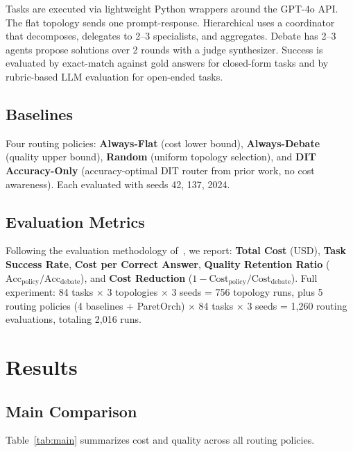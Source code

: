 \documentclass{article}
\begin{document}
Tasks are executed via lightweight Python wrappers around the GPT-4o API. The flat topology sends one prompt-response. Hierarchical uses a coordinator that decomposes, delegates to 2--3 specialists, and aggregates. Debate has 2--3 agents propose solutions over 2 rounds with a judge synthesizer. Success is evaluated by exact-match against gold answers for closed-form tasks and by rubric-based LLM evaluation for open-ended tasks.

\subsection{Baselines}

Four routing policies: \textbf{Always-Flat} (cost lower bound), \textbf{Always-Debate} (quality upper bound), \textbf{Random} (uniform topology selection), and \textbf{DIT Accuracy-Only} (accuracy-optimal DIT router from prior work, no cost awareness). Each evaluated with seeds 42, 137, 2024.

\subsection{Evaluation Metrics}

Following the evaluation methodology of~\cite{hu2024routerbench}, we report: \textbf{Total Cost} (USD), \textbf{Task Success Rate}, \textbf{Cost per Correct Answer}, \textbf{Quality Retention Ratio} ($\text{Acc}_{\text{policy}} / \text{Acc}_{\text{debate}}$), and \textbf{Cost Reduction} ($1 - \text{Cost}_{\text{policy}} / \text{Cost}_{\text{debate}}$). Full experiment: 84 tasks $\times$ 3 topologies $\times$ 3 seeds = 756 topology runs, plus 5 routing policies (4 baselines + ParetOrch) $\times$ 84 tasks $\times$ 3 seeds = 1,260 routing evaluations, totaling 2,016 runs.

\section{Results}
\label{sec:results}

\subsection{Main Comparison}

Table~\ref{tab:main} summarizes cost and quality across all routing policies.
\end{document}
